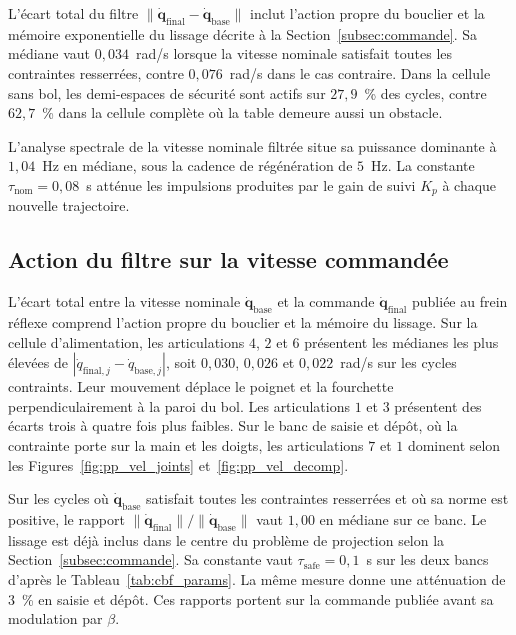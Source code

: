 L'écart total du filtre $\|\dot{\mathbf q}_{\mathrm{final}}-\dot{\mathbf q}_{\mathrm{base}}\|$ inclut l'action propre du bouclier et la mémoire exponentielle du lissage décrite à la Section~\ref{subsec:commande}. Sa médiane vaut $0{,}034$~rad/s lorsque la vitesse nominale satisfait toutes les contraintes resserrées, contre $0{,}076$~rad/s dans le cas contraire. Dans la cellule sans bol, les demi-espaces de sécurité sont actifs sur $27{,}9$~\% des cycles, contre $62{,}7$~\% dans la cellule complète où la table demeure aussi un obstacle.

L'analyse spectrale de la vitesse nominale filtrée situe sa puissance dominante à $1{,}04$~Hz en médiane, sous la cadence de régénération de $5$~Hz. La constante $\tau_{\mathrm{nom}}=0{,}08$~s atténue les impulsions produites par le gain de suivi $K_p$ à chaque nouvelle trajectoire.

\subsection*{Action du filtre sur la vitesse commandée}\label{subsec:res_cbf_action}
L'écart total entre la vitesse nominale $\dot{\mathbf q}_{\mathrm{base}}$ et la commande $\dot{\mathbf q}_{\mathrm{final}}$ publiée au frein réflexe comprend l'action propre du bouclier et la mémoire du lissage. Sur la cellule d'alimentation, les articulations $4$, $2$ et $6$ présentent les médianes les plus élevées de $|\dot q_{\mathrm{final},j}-\dot q_{\mathrm{base},j}|$, soit $0{,}030$, $0{,}026$ et $0{,}022$~rad/s sur les cycles contraints. Leur mouvement déplace le poignet et la fourchette perpendiculairement à la paroi du bol. Les articulations $1$ et $3$ présentent des écarts trois à quatre fois plus faibles. Sur le banc de saisie et dépôt, où la contrainte porte sur la main et les doigts, les articulations $7$ et $1$ dominent selon les Figures~\ref{fig:pp_vel_joints} et~\ref{fig:pp_vel_decomp}.

Sur les cycles où $\dot{\mathbf q}_{\mathrm{base}}$ satisfait toutes les contraintes resserrées et où sa norme est positive, le rapport $\|\dot{\mathbf q}_{\mathrm{final}}\|/\|\dot{\mathbf q}_{\mathrm{base}}\|$ vaut $1{,}00$ en médiane sur ce banc. Le lissage est déjà inclus dans le centre du problème de projection selon la Section~\ref{subsec:commande}. Sa constante vaut $\tau_{\mathrm{safe}}=0{,}1$~s sur les deux bancs d'après le Tableau~\ref{tab:cbf_params}. La même mesure donne une atténuation de $3$~\% en saisie et dépôt. Ces rapports portent sur la commande publiée avant sa modulation par $\beta$.

